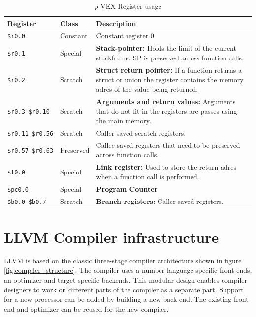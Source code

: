 \begin{table}
  \centering
    \begin{tabular}{|l|l|p{10cm}|}
    \hline
    \textbf{Register} & \textbf{Class} & \textbf{Description}   \\ \hline
    \texttt{\$r0.0}         & Constant  & Constant register 0  \\ \hline
    \texttt{\$r0.1}         & Special   & \textbf{Stack-pointer:} Holds the limit of the current stackframe. 
                                          SP is preserved across function calls.  \\ \hline
    \texttt{\$r0.2}         & Scratch   & \textbf{Struct return pointer:} If a function returns a struct or union the register
                                          contains the memory adres of the value being returned.  \\ \hline
    \texttt{\$r0.3-\$r0.10} & Scratch   & \textbf{Arguments and return values:} Arguments that do not fit in the registers are
                                          passes using the main memory.  \\ \hline
    \texttt{\$r0.11-\$r0.56}& Scratch   & Caller-saved scratch registers.  \\ \hline
    \texttt{\$r0.57-\$r0.63}& Preserved & Callee-saved registers that need to be preserved across function calls.  \\ \hline
    \texttt{\$l0.0}         & Special   & \textbf{Link register:} Used to store the return adres when a function call is 
                                          performed.  \\ \hline
    \texttt{\$pc0.0}        & Special   & \textbf{Program Counter}  \\ \hline
    \texttt{\$b0.0-\$b0.7}  & Scratch   & \textbf{Branch registers:} Caller-saved registers.  \\ \hline
    \end{tabular}
  \caption{$\rho$-VEX Register usage \cite{Joseph-A.-Fisher:2012rm}}
  \label{tbl:rvex_reg}
\end{table}

\section{LLVM Compiler infrastructure}
LLVM is based on the classic three-stage compiler architecture shown in figure \ref{fig:compiler_structure}. The compiler uses a number language specific front-ends, an optimizer and target specific backends. This modular design enables compiler designers to work on different parts of the compiler as a separate part. Support for a new processor can be added by building a new back-end. The existing front-end and optimizer can be reused for the new compiler.

